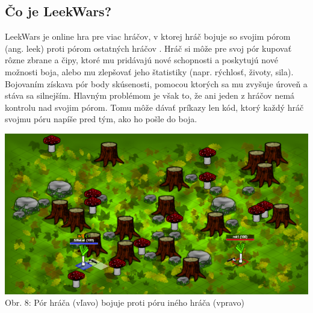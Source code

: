 \documentclass[slovak,a4paper,11pt]{article}
\begin{document}
\subsection{Čo je LeekWars?}
LeekWars je online hra pre viac hráčov, v ktorej hráč bojuje so svojim pórom (ang. leek) proti pórom ostatných hráčov \cite{combefis2016learning}. Hráč si môže pre svoj pór kupovať rôzne zbrane a čipy, ktoré mu pridávajú nové schopnosti a poskytujú nové možnosti boja, alebo mu zlepšovať jeho štatistiky (napr. rýchlosť, životy, sila). Bojovaním získava pór body skúsenosti, pomocou ktorých sa mu zvyšuje úroveň a stáva sa silnejším. Hlavným problémom je však to, že ani jeden z hráčov nemá kontrolu nad svojim pórom. Tomu môže dávať príkazy len kód, ktorý každý hráč svojmu póru napíše pred tým, ako ho pošle do boja. \\
\begin{center}
\includegraphics[scale=0.4]{leekwarsmain}
\\ Obr. 8: Pór hráča (vľavo) bojuje proti póru iného hráča (vpravo)
\end{center}
\end{document}
